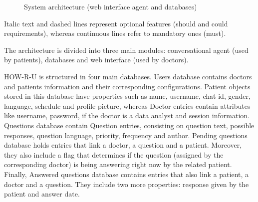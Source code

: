\documentclass[12pt,english]{article}
\begin{document}
\begin{figure}[H]
    \caption{System architecture (web interface agent and databases)}
\end{figure}


Italic text and dashed lines represent optional features (should and could requirements), whereas continuous  lines refer to mandatory ones (must).

The architecture is divided into three main modules: conversational agent (used by patients), databases and web interface (used by doctors).

HOW-R-U is structured in four main databases. Users database contains doctors and patients information and their corresponding configurations. Patient objects stored in this database have properties such as name, username, chat id, gender, language, schedule and profile picture, whereas Doctor entries contain attributes like username, password, if the doctor is a data analyst and session information. Questions database contain Question entries, consisting on question text, possible responses, question language, priority, frequency and author. Pending questions database holds entries that link a doctor, a question and a patient. Moreover, they also include a flag that determines if the question (assigned by the corresponding doctor) is being answering right now by the related patient. Finally, Answered questions database contains entries that also link a patient, a doctor and a question. They include two more properties: response given by the patient and answer date.
\end{document}
